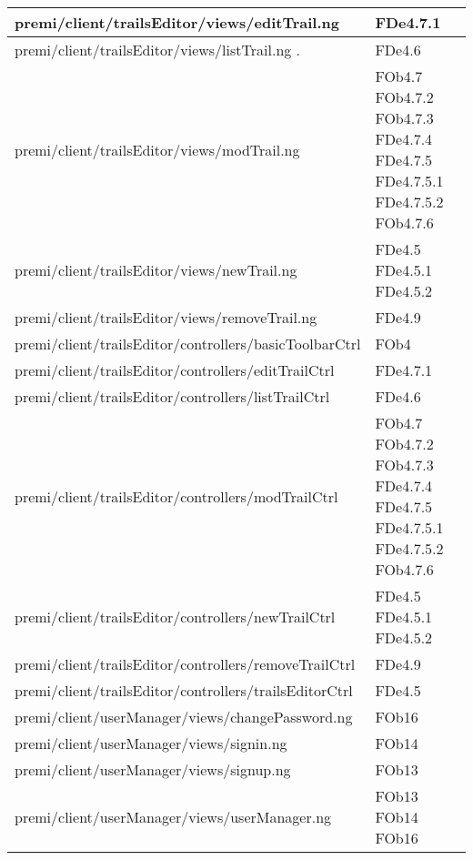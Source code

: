 \begin{longtable}{|p{10cm}|p{4cm}|}
\hline
\hspace{0pt}premi/client/trailsEditor/views/editTrail.ng  & FDe4.7.1 \\
\hline
\hspace{0pt}premi/client/trailsEditor/views/listTrail.ng . & FDe4.6 \\
\hline
\hspace{0pt}premi/client/trailsEditor/views/modTrail.ng  & FOb4.7 FOb4.7.2 FOb4.7.3 FDe4.7.4 FDe4.7.5 FDe4.7.5.1 FDe4.7.5.2 FOb4.7.6 \\
\hline
\hspace{0pt}premi/client/trailsEditor/views/newTrail.ng  & FDe4.5 FDe4.5.1 FDe4.5.2 \\
\hline
\hspace{0pt}premi/client/trailsEditor/views/removeTrail.ng  & FDe4.9 \\
\hline
\hspace{0pt}premi/client/trailsEditor/controllers/basicToolbarCtrl  & FOb4 \\
\hline
\hspace{0pt}premi/client/trailsEditor/controllers/editTrailCtrl  & FDe4.7.1 \\
\hline
\hspace{0pt}premi/client/trailsEditor/controllers/listTrailCtrl  & FDe4.6 \\
\hline
\hspace{0pt}premi/client/trailsEditor/controllers/modTrailCtrl  & FOb4.7 FOb4.7.2 FOb4.7.3 FDe4.7.4 FDe4.7.5 FDe4.7.5.1 FDe4.7.5.2 FOb4.7.6 \\
\hline
\hspace{0pt}premi/client/trailsEditor/controllers/newTrailCtrl  & FDe4.5 FDe4.5.1 FDe4.5.2 \\
\hline
\hspace{0pt}premi/client/trailsEditor/controllers/removeTrailCtrl  & FDe4.9 \\
\hline
\hspace{0pt}premi/client/trailsEditor/controllers/trailsEditorCtrl  & FDe4.5 \\
\hline
\hspace{0pt}premi/client/userManager/views/changePassword.ng  & FOb16  \\
\hline
\hspace{0pt}premi/client/userManager/views/signin.ng  & FOb14 \\
\hline
\hspace{0pt}premi/client/userManager/views/signup.ng  & FOb13 \\
\hline
\hspace{0pt}premi/client/userManager/views/userManager.ng  & FOb13  FOb14 FOb16 \\

\end{longtable}
